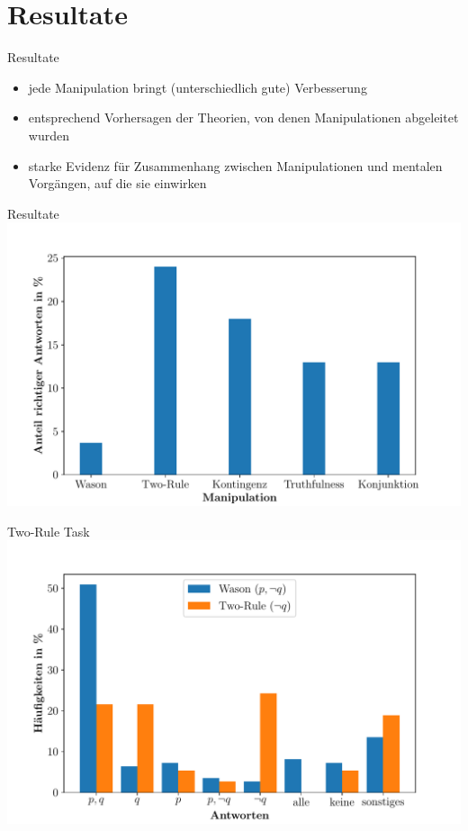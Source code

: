 
\section{Resultate}

\begin{frame}{Resultate {\scriptsize \cite[S.~101-102]{stenningHumanReasoningCognitive2008}}}
    \begin{itemize}
        \item jede Manipulation bringt (unterschiedlich gute) Verbesserung
        \item entsprechend Vorhersagen der Theorien, von denen Manipulationen abgeleitet wurden
        \item starke Evidenz für Zusammenhang zwischen Manipulationen und mentalen Vorgängen, auf die sie einwirken
    \end{itemize}
\end{frame}


\begin{frame}{Resultate {\scriptsize \cite[S.~101]{stenningHumanReasoningCognitive2008}}}
    \includegraphics[width=\textwidth]{../plot/results_correct.pdf}
\end{frame}


\begin{frame}{Two-Rule Task {\scriptsize \cite[S.~102-104]{stenningHumanReasoningCognitive2008}}}
    \includegraphics[width=\textwidth]{../plot/results_two_rule.pdf}
\end{frame}


